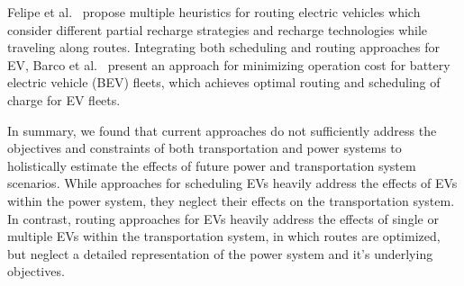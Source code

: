 Felipe et al.~\cite{felipe2014heuristic} propose multiple heuristics for routing electric vehicles which consider different partial recharge strategies and recharge technologies while traveling along routes. 
Integrating both scheduling and routing approaches for EV, Barco et al.~\cite{barco2013optimal} present an approach for minimizing operation cost for battery electric vehicle (BEV) fleets, which achieves optimal routing and scheduling of charge for EV fleets.


In summary, we found that current approaches do not sufficiently address the objectives and constraints of both transportation and power systems to holistically estimate the effects of future power and transportation system scenarios. While approaches for scheduling EVs heavily address the effects of EVs within the power system, they neglect their effects on the transportation system. In contrast, routing approaches for EVs heavily address the effects of single or multiple EVs within the transportation system, in which routes are optimized, but neglect a detailed representation of the power system and it's underlying objectives.


